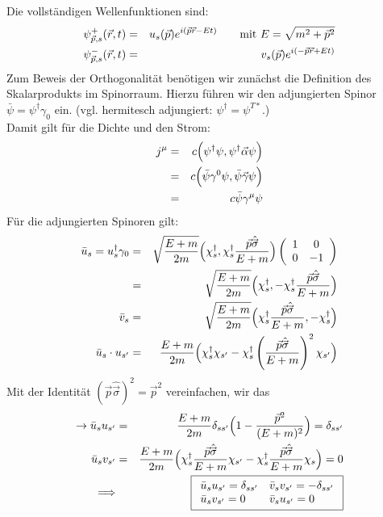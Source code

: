 Die vollständigen Wellenfunktionen sind:
\begin{eqnarray*}
\psi^+ _{\vec p,s}(\vec r,t) &=& u_s(\vec p)e^{i(\vec p\vec r-Et)} \qquad \text{mit }E = \sqrt{m^2+ \vec p^2}\\
\psi^- _{\vec p,s}(\vec r,t) &=& v_s(\vec p)e^{i(-\vec p\vec r+Et)}
\end{eqnarray*}
Zum Beweis der Orthogonalität benötigen wir zunächst die Definition des Skalarprodukts im Spinorraum. Hierzu führen wir den adjungierten Spinor $\bar \psi = \psi^{\dagger} \gamma_0$ ein.
(vgl. hermitesch adjungiert: $\psi^{\dagger} = \psi^{T*}$.)\\
Damit gilt für die Dichte und den Strom:
\begin{eqnarray*} 
j^\mu &=& c \Big ( \psi^\dagger \psi, \psi^\dagger \vec \alpha \psi\Big)\\
&=& c \Big ( \bar \psi \gamma^0 \psi, \bar \psi \vec \gamma \psi \Big)\\
&=& c \bar \psi\gamma^\mu \psi 
\end{eqnarray*}
Für die adjungierten Spinoren gilt:
\begin{eqnarray*} \bar u_s = u_s^\dagger \gamma_0 &=& \sqrt{\frac {E+m}{2 m}}\Big(\chi^\dagger_s,\chi_s^\dagger \frac{\vec p\hat{\vec \sigma}}{E+m}\Big)\left(\begin{array}{cc}1&0\\0&-1\end{array}\right)\\
&=&\sqrt{\frac {E+m}{2 m}}\Big(\chi^\dagger_s,-\chi_s^\dagger \frac{\vec p\hat{\vec \sigma}}{E+m}\Big)\\
\bar v_s &=& \sqrt{\frac {E+m}{2 m}}\Big(\chi^\dagger_s \frac{\vec p\hat{\vec \sigma}}{E+m},-\chi_s^\dagger\Big)\\
\bar u_s \cdot u_{s'} &=& \frac {E+m}{2 m}\Big(\chi^\dagger_s \chi_{s'}-\chi_s^\dagger \left(\frac{\vec p\hat{\vec \sigma}}{E+m}\right)^2\chi_{s'}\Big)
\end{eqnarray*}
Mit der Identität $(\vec p \hat{\vec \sigma})^2=\vec p^2$ vereinfachen, wir das
\begin{eqnarray*}
\rightarrow \bar u_su_{s'} &=& \frac{E+m} {2m}\delta_{ss'} \Big(1 - \frac{\vec p^2}{(E+m)^2}\Big) = \delta_{ss'}\\
\bar u_sv_{s'} &=& \frac{E+m}{2m} \Big( \chi_s^\dagger \frac{\vec p\hat{\vec \sigma}}{E+m}\chi_{s'} - \chi_s^\dagger \frac{\vec p\hat {\vec\sigma}}{E+m}\chi_s\Big)= 0\\
\Longrightarrow &{}& \boxed{\begin{array}{ll}\bar u_s u_{s'} = \delta_{ss'} &\bar v_s v_{s'} = -\delta_{ss'}\\\bar u_s v_{s'} = 0 & \bar v_s u_{s'} = 0 \end{array}}
\end{eqnarray*}
